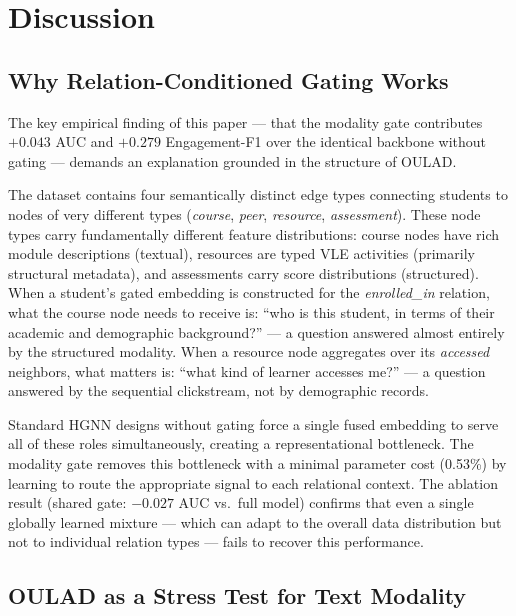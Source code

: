 \documentclass[sigconf]{acmart}
\begin{document}
\section{Discussion}
\label{sec:discussion}

\subsection{Why Relation-Conditioned Gating Works}

The key empirical finding of this paper --- that the
modality gate contributes $+0.043$ AUC and $+0.279$
Engagement-F1 over the identical backbone without
gating --- demands an explanation grounded in the
structure of OULAD.

The dataset contains four semantically distinct edge
types connecting students to nodes of very different
types (\textit{course}, \textit{peer},
\textit{resource}, \textit{assessment}).
These node types carry fundamentally different
feature distributions:
course nodes have rich module descriptions
(textual), resources are typed VLE activities
(primarily structural metadata), and assessments
carry score distributions (structured). When a
student's gated embedding is constructed for the
\textit{enrolled\_in} relation, what the course node
needs to receive is: ``who is this student, in terms
of their academic and demographic background?'' ---
a question answered almost entirely by the structured
modality. When a resource node aggregates over its
\textit{accessed} neighbors, what matters is:
``what kind of learner accesses me?'' --- a question
answered by the sequential clickstream, not by
demographic records.

Standard HGNN designs without gating force a single
fused embedding to serve all of these roles
simultaneously, creating a representational
bottleneck. The modality gate removes this
bottleneck with a minimal parameter cost (0.53\%)
by learning to route the appropriate signal to
each relational context. The ablation result
(shared gate: $-0.027$ AUC vs.\ full model)
confirms that even a single globally learned mixture
--- which can adapt to the overall data distribution
but not to individual relation types --- fails to
recover this performance.

\subsection{OULAD as a Stress Test for Text Modality}
\end{document}
